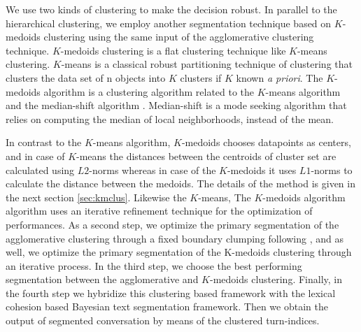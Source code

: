 \documentclass{article}
\begin{document}
We use two kinds of clustering to make the decision robust. In parallel to the hierarchical clustering, we employ another segmentation technique based on $K$-medoids clustering using the same input of the agglomerative clustering technique. $K$-medoids clustering is a flat clustering technique like $K$-means clustering. $K$-means is a classical robust partitioning technique of clustering that clusters the data set of n objects into $K$ clusters if $K$ known \emph{a priori}. The $K$-medoids algorithm is a clustering algorithm related to the $K$-means algorithm and the median-shift algorithm \cite{shapira-09}. Median-shift is a mode seeking algorithm that relies on computing the median of local neighborhoods, instead of the mean.

In contrast to the $K$-means algorithm, $K$-medoids chooses datapoints as centers, and in case of $K$-means the distances between the centroids of cluster set are calculated using $L2$-norms whereas in case of the $K$-medoids it uses $L1$-norms to calculate the distance between the medoids. The details of the method is given in the next section \ref{sec:kmclus}. Likewise the $K$-means, The $K$-medoids algorithm algorithm uses an iterative refinement technique for the optimization of performances.
%
As a second step, we optimize the primary segmentation of the agglomerative clustering through a fixed boundary clumping following \cite{niekrasz-10}, and as well, we optimize the primary segmentation of the K-medoids clustering through an iterative process.
%
In the third step, we choose the best performing segmentation between the agglomerative and $K$-medoids clustering. 
%
Finally, in the fourth step we hybridize this clustering based framework with the lexical cohesion based Bayesian text segmentation framework. Then we obtain the output of segmented conversation by means of the clustered turn-indices.  
\end{document}
